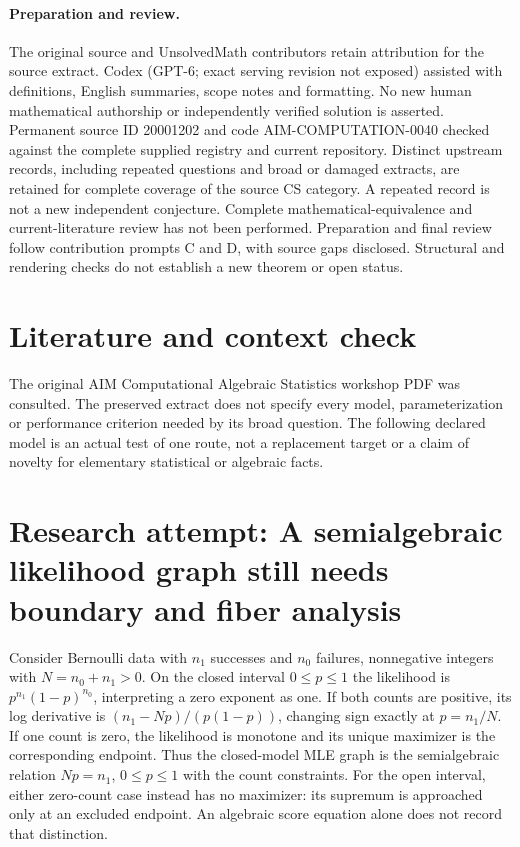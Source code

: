 \documentclass[11pt]{article}
\begin{document}
\paragraph{Preparation and review.}
The original source and UnsolvedMath contributors retain attribution for the source extract. Codex (GPT-6; exact serving revision not exposed) assisted with definitions, English summaries, scope notes and formatting. No new human mathematical authorship or independently verified solution is asserted. Permanent source ID 20001202 and code AIM-COMPUTATION-0040 checked against the complete supplied registry and current repository. Distinct upstream records, including repeated questions and broad or damaged extracts, are retained for complete coverage of the source CS category. A repeated record is not a new independent conjecture. Complete mathematical-equivalence and current-literature review has not been performed. Preparation and final review follow contribution prompts C and D, with source gaps disclosed. Structural and rendering checks do not establish a new theorem or open status.
\label{end:20001202}

\section{Literature and context check}
The original AIM Computational Algebraic Statistics
 workshop PDF was consulted. The preserved extract does not specify every model,
 parameterization or performance criterion needed by its broad question. The
 following declared model is an actual test of one route, not a replacement
 target or a claim of novelty for elementary statistical or algebraic facts.
\section{Research attempt: A semialgebraic likelihood graph still needs boundary and fiber analysis}
Consider Bernoulli data with $n_1$ successes and $n_0$ failures, nonnegative
integers with $N=n_0+n_1>0$. On the closed interval $0\le p\le1$ the likelihood
is $p^{n_1}(1-p)^{n_0}$, interpreting a zero exponent as one. If both counts
are positive, its log derivative is $(n_1-Np)/(p(1-p))$, changing sign exactly
at $p=n_1/N$. If one count is zero, the likelihood is monotone and its unique
maximizer is the corresponding endpoint. Thus the closed-model MLE graph is
the semialgebraic relation $Np=n_1$, $0\le p\le1$ with the count constraints.
For the open interval, either zero-count case instead has no maximizer: its
supremum is approached only at an excluded endpoint. An algebraic score equation
alone does not record that distinction.
\end{document}
